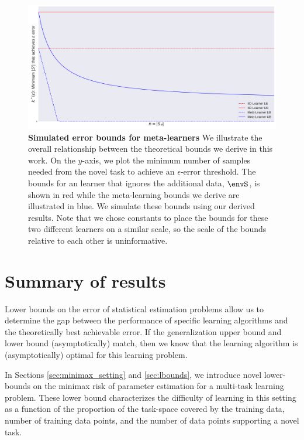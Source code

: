 
\begin{figure}[ht]
\centering
\includegraphics[width=\linewidth]{main/images/min_k_bounds_plot.pdf}\vspace{-0.5cm}
\caption{\textbf{Simulated error bounds for meta-learners} We illustrate the overall relationship between the theoretical bounds we derive in this work. On the $y$-axis, we plot the minimum number of samples needed from the novel task to achieve an $\epsilon$-error threshold. The bounds for an \iid learner that ignores the additional data, $\envS$, is shown in red while the meta-learning bounds we derive are illustrated in blue. We simulate these bounds using our derived results.
Note that we chose constants to 
place the bounds for these two different learners on a similar scale, so the scale of the bounds relative to each other is uninformative.}
\label{fig:learning_bounds}
\end{figure}

\section{Summary of results}
\label{sec:summary}


Lower bounds on the error of statistical estimation problems allow us to determine the gap between
the performance of specific learning algorithms and the theoretically best achievable error. If the
generalization upper bound and lower bound (asymptotically) match, then we know that the learning
algorithm is (asymptotically) optimal for this learning problem.

In Sections \ref{sec:minimax_setting} and \ref{sec:lbounds}, we introduce novel lower-bounds on the minimax risk of parameter estimation for a
multi-task learning problem. These lower bound characterizes the difficulty of learning in this
setting as a function of the proportion of the task-space covered by the training data, number of
training data points, and the number of data points supporting a novel task.

